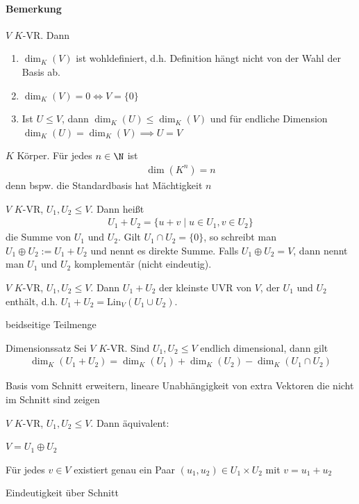\paragraph{Bemerkung} $V$ $K$-VR. Dann
\begin{enumerate}
	\item $\dim_K(V)$ ist wohldefiniert, d.h. Definition hängt nicht von der Wahl der Basis ab.
	\item $\dim_K(V)=0\iff V=\{0\}$
	\item Ist $U\leq V$, dann $\dim_K(U)\leq \dim_K(V)$ und für endliche Dimension $\dim_K(U)=\dim_K(V)\implies U=V$
\end{enumerate}
\begin{example}
	$K$ Körper. Für jedes $n\in\N$ ist
	\begin{align*}
		\dim(K^n)=n
	\end{align*}
	denn bspw. die Standardbasis hat Mächtigkeit $n$
\end{example}
\begin{definition}
	$V$ $K$-VR, $U_1, U_2 \leq V$. Dann heißt 
	\begin{align*}
		U_1+U_2=\{u+v\mid u\in U_1, v\in U_2\}
	\end{align*}
	die Summe von $U_1$ und $U_2$. Gilt $U_1\cap U_2 = \{0\}$, so schreibt man $U_1\oplus U_2:= U_1+U_2$ und nennt es direkte Summe. Falls $U_1\oplus U_2=V$, dann nennt man $U_1$ und $U_2$ komplementär (nicht eindeutig).
\end{definition}
\begin{theorem}
	$V$ $K$-VR, $U_1,U_2\leq V$. Dann $U_1+U_2$ der kleinste UVR von $V$, der $U_1$ und $U_2$ enthält, d.h. $U_1+U_2=\mathrm{Lin}_V(U_1\cup U_2)$.
\end{theorem}
\prove beidseitige Teilmenge 
\begin{theorem}{Dimensionssatz}
	Sei $V$ $K$-VR. Sind $U_1, U_2 \leq V$ endlich dimensional, dann gilt\begin{align*}
		\dim_K(U_1+U_2)=\dim_K(U_1)+\dim_K(U_2)-\dim_K(U_1\cap U_2)
	\end{align*}
\end{theorem}
\prove Basis vom Schnitt erweitern, lineare Unabhängigkeit von extra Vektoren die nicht im Schnitt sind zeigen
\begin{theorem}
	$V$ $K$-VR, $U_1, U_2\leq V$. Dann äquivalent:
	\begin{enumerateroman}
	\item $V=U_1\oplus U_2$
	\item Für jedes $v\in V$ existiert genau ein Paar $(u_1,u_2)\in U_1\times U_2$ mit $v=u_1+u_2$
	\end{enumerateroman}
\end{theorem}
\prove \begin{enumerateroman}
\item Eindeutigkeit über Schnitt
\end{enumerateroman}














